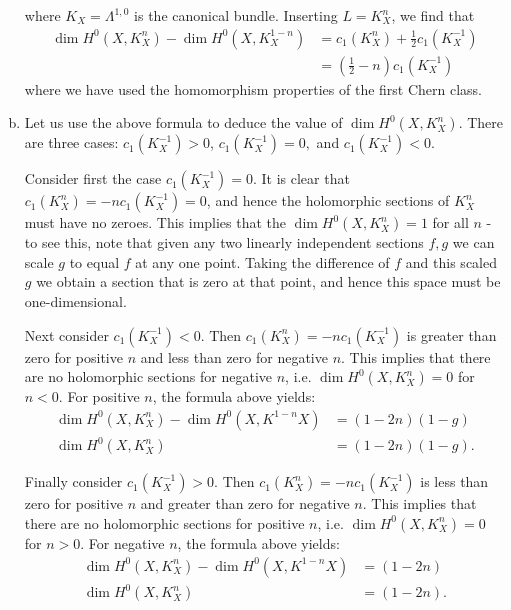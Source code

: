 \documentclass{../mathnotes}
\begin{document}
\begin{enumerate}[(a)]
        where $K_X=\Lambda^{1,0}$ is the canonical bundle. Inserting $L=K_X^n$, we find that
        \begin{align*}
            \dim H^0(X,K_X^n)-\dim H^0(X,K_X^{1-n})&=c_1(K_X^n)+\frac{1}{2}c_1(K_X^{-1})\\
            &=\left( \frac{1}{2}-n \right)c_1(K_X^{-1})
        \end{align*}
        where we have used the homomorphism properties of the first Chern class.
    \item Let us use the above formula to deduce the value of $\dim H^0(X,K_X^n)$. There are three cases: $c_1(K^{-1}_X)>0$, $c_1(K^{-1}_X)=0,$ and $c_1(K^{-1}_X)<0$.
        
        Consider first the case $c_1(K^{-1}_X)=0$. It is clear that $c_1(K^{n}_X)=-nc_1(K^{-1}_X)=0$, and hence the holomorphic sections of $K^{n}_X$ must have
        no zeroes. This implies that the $\dim H^0(X,K_X^{n})=1$ for all $n$ - to see this, note that given any two linearly independent sections $f,g$ we can
        scale $g$ to equal $f$ at any one point. Taking the difference of $f$ and this scaled $g$ we obtain a section that is zero at that point, and hence this
        space must be one-dimensional.
        
        Next consider $c_1(K^{-1}_X)<0$. Then $c_1(K^{n}_X)=-nc_1(K^{-1}_X)$ is greater than zero for positive $n$ and less than zero for negative $n$.
        This implies that there are no holomorphic sections for negative $n$, i.e. $\dim H^0(X,K_X^{n})=0$ for $n<0$. For positive $n$, the formula above yields:
        \begin{align*}
            \dim H^0(X,K_X^n)-\dim H^0(X,K^{1-n}X)&=(1-2n)(1-g)\\            
            \dim H^0(X,K_X^n)&=(1-2n)(1-g).
        \end{align*}

        Finally consider $c_1(K^{-1}_X)>0$. Then $c_1(K^{n}_X)=-nc_1(K^{-1}_X)$ is less than zero for positive $n$ and greater than zero for negative $n$.
        This implies that there are no holomorphic sections for positive $n$, i.e. $\dim H^0(X,K_X^{n})=0$ for $n>0$. For negative $n$, the formula above yields:
        \begin{align*}
            \dim H^0(X,K_X^n)-\dim H^0(X,K^{1-n}X)&=(1-2n)\\
            \dim H^0(X,K_X^n)&=(1-2n).
        \end{align*}




\end{enumerate}
\end{document}

